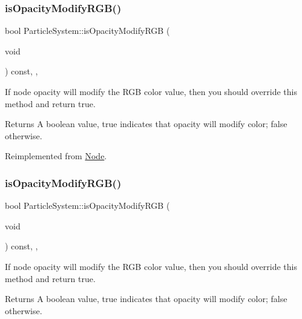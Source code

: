 \subsubsection{\texorpdfstring{is\+Opacity\+Modify\+R\+G\+B()}{isOpacityModifyRGB()}\hspace{0.1cm}{\footnotesize\ttfamily [1/2]}}
{\footnotesize\ttfamily bool Particle\+System\+::is\+Opacity\+Modify\+R\+GB (\begin{DoxyParamCaption}\item[{void}]{ }\end{DoxyParamCaption}) const\hspace{0.3cm}{\ttfamily [inline]}, {\ttfamily [override]}, {\ttfamily [virtual]}}

If node opacity will modify the R\+GB color value, then you should override this method and return true. \begin{DoxyReturn}{Returns}
A boolean value, true indicates that opacity will modify color; false otherwise. 
\end{DoxyReturn}


Reimplemented from \hyperlink{classNode_ae6ce32d2088e2bb3426608334f1091c5}{Node}.

\mbox{\label{classParticleSystem_a36df0682b59803de36c914ce2bffe47d}} 
\subsubsection{\texorpdfstring{is\+Opacity\+Modify\+R\+G\+B()}{isOpacityModifyRGB()}\hspace{0.1cm}{\footnotesize\ttfamily [2/2]}}
{\footnotesize\ttfamily bool Particle\+System\+::is\+Opacity\+Modify\+R\+GB (\begin{DoxyParamCaption}\item[{void}]{ }\end{DoxyParamCaption}) const\hspace{0.3cm}{\ttfamily [inline]}, {\ttfamily [override]}, {\ttfamily [virtual]}}

If node opacity will modify the R\+GB color value, then you should override this method and return true. \begin{DoxyReturn}{Returns}
A boolean value, true indicates that opacity will modify color; false otherwise. 
\end{DoxyReturn}


